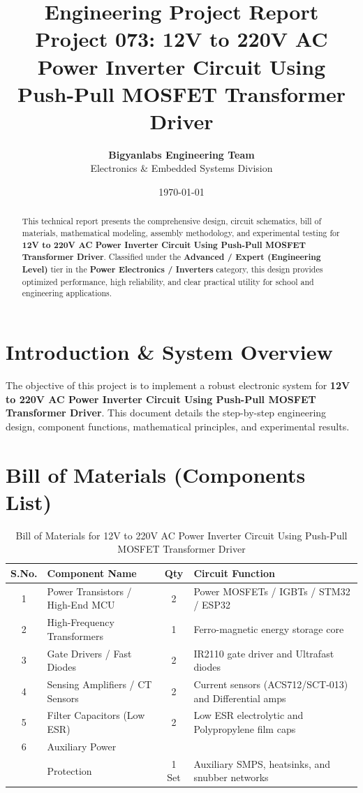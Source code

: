 \documentclass[11pt,a4paper]{article}
\title{\textbf{\Huge Engineering Project Report}\\[0.5em] \Large Project 073: 12V to 220V AC Power Inverter Circuit Using Push-Pull MOSFET Transformer Driver}
\author{\textbf{Bigyanlabs Engineering Team}\\ Electronics \& Embedded Systems Division}
\date{\today}
\begin{document}
\maketitle
\thispagestyle{empty}

\begin{abstract}
This technical report presents the comprehensive design, circuit schematics, bill of materials, mathematical modeling, assembly methodology, and experimental testing for \textbf{12V to 220V AC Power Inverter Circuit Using Push-Pull MOSFET Transformer Driver}. Classified under the \textbf{Advanced / Expert (Engineering Level)} tier in the \textbf{Power Electronics / Inverters} category, this design provides optimized performance, high reliability, and clear practical utility for school and engineering applications.
\end{abstract}

\newpage
\tableofcontents
\newpage

\section{Introduction \& System Overview}
The objective of this project is to implement a robust electronic system for \textbf{12V to 220V AC Power Inverter Circuit Using Push-Pull MOSFET Transformer Driver}. This document details the step-by-step engineering design, component functions, mathematical principles, and experimental results.

\section{Bill of Materials (Components List)}
\begin{table}[h!]
\centering
\caption{Bill of Materials for 12V to 220V AC Power Inverter Circuit Using Push-Pull MOSFET Transformer Driver}
\vspace{0.5em}
\begin{tabular}{clcp{7cm}}
\toprule
\textbf{S.No.} & \textbf{Component Name} & \textbf{Qty} & \textbf{Circuit Function} \\
\midrule
1 & Power Transistors / High-End MCU & 2 & Power MOSFETs / IGBTs / STM32 / ESP32 \\
2 & High-Frequency Transformers & 1 & Ferro-magnetic energy storage core \\
3 & Gate Drivers / Fast Diodes & 2 & IR2110 gate driver and Ultrafast diodes \\
4 & Sensing Amplifiers / CT Sensors & 2 & Current sensors (ACS712/SCT-013) and Differential amps \\
5 & Filter Capacitors (Low ESR) & 2 & Low ESR electrolytic and Polypropylene film caps \\
6 & Auxiliary Power \\& Protection & 1 Set & Auxiliary SMPS, heatsinks, and snubber networks \\
\bottomrule
\end{tabular}
\end{table}
\end{document}
